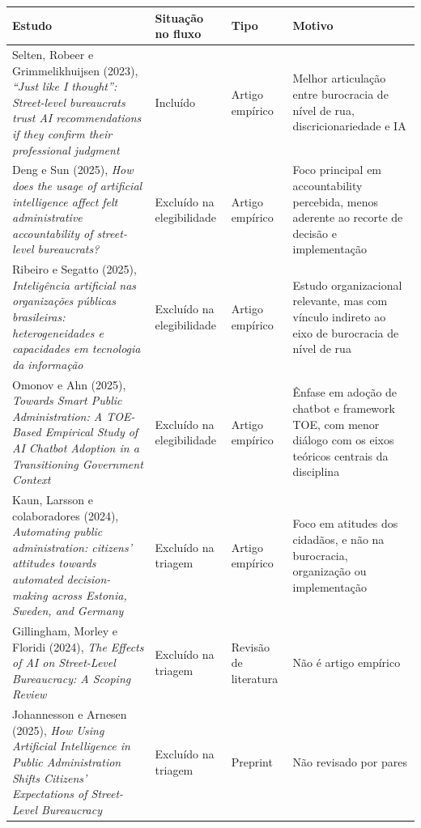\documentclass[12pt]{article}
\begin{document}
\begin{table}[htbp]
\centering
\scriptsize
\setlength{\tabcolsep}{3pt}
\renewcommand{\arraystretch}{1.15}
\begin{tabularx}{\textwidth}{>{\raggedright\arraybackslash}X >{\raggedright\arraybackslash}m{} >{\raggedright\arraybackslash}m{} >{\raggedright\arraybackslash}m{}}
\toprule
Estudo & Situação no fluxo & Tipo & Motivo \\
\midrule
Selten, Robeer e Grimmelikhuijsen (2023), \textit{“Just like I thought”: Street-level bureaucrats trust AI recommendations if they confirm their professional judgment} & Incluído & Artigo empírico & Melhor articulação entre burocracia de nível de rua, discricionariedade e IA \\
Deng e Sun (2025), \textit{How does the usage of artificial intelligence affect felt administrative accountability of street-level bureaucrats?} & Excluído na elegibilidade & Artigo empírico & Foco principal em accountability percebida, menos aderente ao recorte de decisão e implementação \\
Ribeiro e Segatto (2025), \textit{Inteligência artificial nas organizações públicas brasileiras: heterogeneidades e capacidades em tecnologia da informação} & Excluído na elegibilidade & Artigo empírico & Estudo organizacional relevante, mas com vínculo indireto ao eixo de burocracia de nível de rua \\
Omonov e Ahn (2025), \textit{Towards Smart Public Administration: A TOE-Based Empirical Study of AI Chatbot Adoption in a Transitioning Government Context} & Excluído na elegibilidade & Artigo empírico & Ênfase em adoção de chatbot e framework TOE, com menor diálogo com os eixos teóricos centrais da disciplina \\
Kaun, Larsson e colaboradores (2024), \textit{Automating public administration: citizens' attitudes towards automated decision-making across Estonia, Sweden, and Germany} & Excluído na triagem & Artigo empírico & Foco em atitudes dos cidadãos, e não na burocracia, organização ou implementação \\
Gillingham, Morley e Floridi (2024), \textit{The Effects of AI on Street-Level Bureaucracy: A Scoping Review} & Excluído na triagem & Revisão de literatura & Não é artigo empírico \\
Johannesson e Arnesen (2025), \textit{How Using Artificial Intelligence in Public Administration Shifts Citizens' Expectations of Street-Level Bureaucracy} & Excluído na triagem & Preprint & Não revisado por pares \\
\bottomrule
\end{tabularx}
\normalsize
\end{table}
\end{document}
